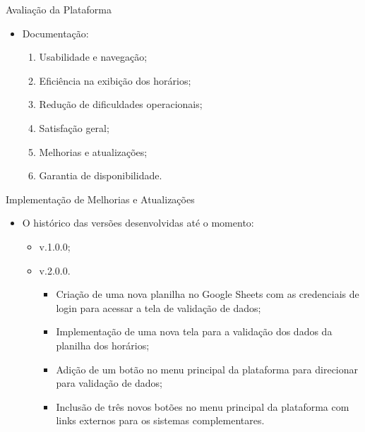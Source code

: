 \begin{frame}{Avaliação da Plataforma}
    \begin{itemize}
        \item Documentação: \vspace{0.5cm}
              \begin{enumerate}
                  \item Usabilidade e navegação; \vspace{0.5cm}
                  \item Eficiência na exibição dos horários; \vspace{0.5cm}
                  \item Redução de dificuldades operacionais; \vspace{0.5cm}
                  \item Satisfação geral; \vspace{0.5cm}
                  \item Melhorias e atualizações; \vspace{0.5cm}
                  \item Garantia de disponibilidade. \vspace{0.5cm}
              \end{enumerate}
    \end{itemize}
\end{frame}

\begin{frame}{Implementação de Melhorias e Atualizações}
    \begin{itemize}
        \item O histórico das versões desenvolvidas até o momento: \vspace{0.5cm}
              \begin{itemize}
                  \item v.1.0.0; \vspace{0.5cm}
                  \item v.2.0.0. \vspace{0.25cm}
                  \begin{itemize}
                    \item Criação de uma nova planilha no Google Sheets com as credenciais de login para acessar a tela de validação de dados; \vspace{0.25cm}
                    \item Implementação de uma nova tela para a validação dos dados da planilha dos horários; \vspace{0.25cm}
                    \item Adição de um botão no menu principal da plataforma para direcionar para validação de dados; \vspace{0.25cm}
                    \item Inclusão de três novos botões no menu principal da plataforma com links externos para os sistemas complementares. \vspace{0.25cm}
                  \end{itemize}
              \end{itemize}
    \end{itemize}
\end{frame}

